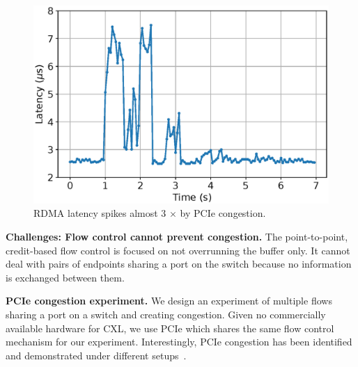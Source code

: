 \begin{figure}[t!]  
    \centering
    \includegraphics[width=0.8\columnwidth]{figure/aurelia/pcie-congestion.eps}  
    \caption{RDMA latency spikes almost 3 $\times$ by PCIe congestion.}
    \label{fig:pcie-congestion}        
\end{figure}

\noindent \textbf{Challenges: Flow control cannot prevent congestion.}
The point-to-point, credit-based flow control is focused on not overrunning the buffer only. 
%
It cannot deal with pairs of endpoints sharing a port on the switch because no information is exchanged between them. 


\noindent \textbf{PCIe congestion experiment.}
We design an experiment of multiple flows sharing a port on a switch and creating congestion.
%
Given no commercially available hardware for CXL, we use PCIe which shares the same flow control mechanism for our experiment. Interestingly, PCIe congestion has been identified and demonstrated under different setups~\cite{sbfc:ieee-micro:2005, pcie-congestion-model:sc:2016, invisible-probe:oaklnad:2021}. 

